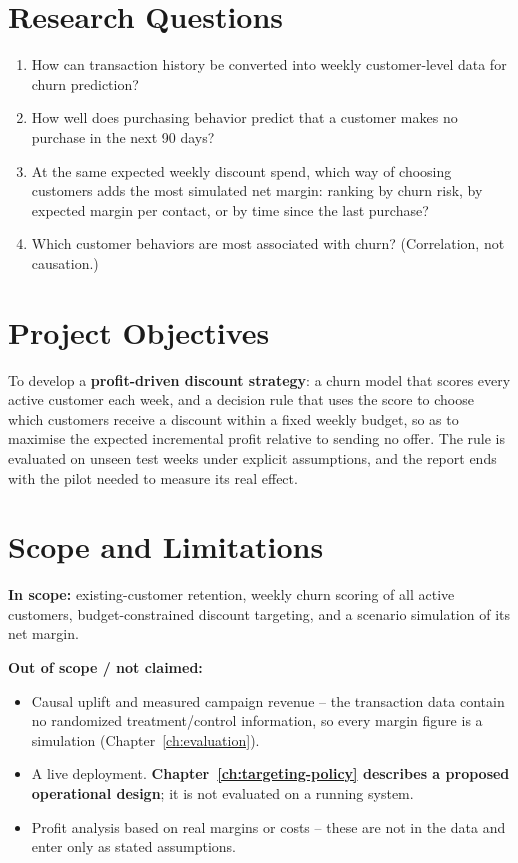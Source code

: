 \section{Research Questions}
\label{sec:1-3}

\begin{enumerate}
    \item How can transaction history be converted into weekly customer-level data for churn prediction?
    \item How well does purchasing behavior predict that a customer makes no purchase in the next 90 days?
    \item At the same expected weekly discount spend, which way of choosing customers adds the most simulated net margin: ranking by churn risk, by expected margin per contact, or by time since the last purchase?
    \item Which customer behaviors are most associated with churn? (Correlation, not causation.)
\end{enumerate}

\section{Project Objectives}
\label{sec:1-4}

To develop a \textbf{profit-driven discount strategy}: a churn model that scores every active customer each week, and a decision rule that uses the score to choose which customers receive a discount within a fixed weekly budget, so as to maximise the expected incremental profit relative to sending no offer. The rule is evaluated on unseen test weeks under explicit assumptions, and the report ends with the pilot needed to measure its real effect.

\section{Scope and Limitations}
\label{sec:1-5}

\textbf{In scope:} existing-customer retention, weekly churn scoring of all active customers, budget-constrained discount targeting, and a scenario simulation of its net margin.

\textbf{Out of scope / not claimed:}
\begin{itemize}
    \item Causal uplift and measured campaign revenue -- the transaction data contain no randomized treatment/control information, so every margin figure is a simulation (Chapter~\ref{ch:evaluation}).
    \item A live deployment. \textbf{Chapter~\ref{ch:targeting-policy} describes a proposed operational design}; it is not evaluated on a running system.
    \item Profit analysis based on real margins or costs -- these are not in the data and enter only as stated assumptions.
\end{itemize}

